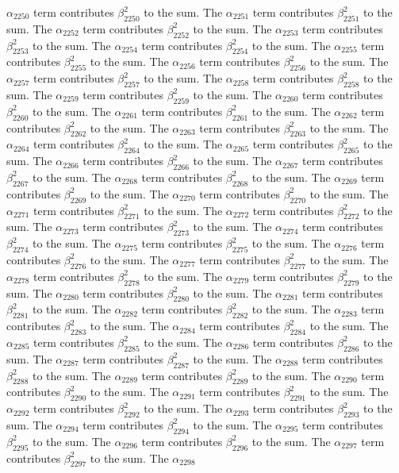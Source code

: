 \begin{lemma}
$\alpha_{2250}$ term contributes $\beta_{2250}^{2}$ to the sum. The $\alpha_{2251}$ term contributes $\beta_{2251}^{2}$ to the sum. The $\alpha_{2252}$ term contributes $\beta_{2252}^{2}$ to the sum. The $\alpha_{2253}$ term contributes $\beta_{2253}^{2}$ to the sum. The $\alpha_{2254}$ term contributes $\beta_{2254}^{2}$ to the sum. The $\alpha_{2255}$ term contributes $\beta_{2255}^{2}$ to the sum. The $\alpha_{2256}$ term contributes $\beta_{2256}^{2}$ to the sum. The $\alpha_{2257}$ term contributes $\beta_{2257}^{2}$ to the sum. The $\alpha_{2258}$ term contributes $\beta_{2258}^{2}$ to the sum. The $\alpha_{2259}$ term contributes $\beta_{2259}^{2}$ to the sum. The $\alpha_{2260}$ term contributes $\beta_{2260}^{2}$ to the sum. The $\alpha_{2261}$ term contributes $\beta_{2261}^{2}$ to the sum. The $\alpha_{2262}$ term contributes $\beta_{2262}^{2}$ to the sum. The $\alpha_{2263}$ term contributes $\beta_{2263}^{2}$ to the sum. The $\alpha_{2264}$ term contributes $\beta_{2264}^{2}$ to the sum. The $\alpha_{2265}$ term contributes $\beta_{2265}^{2}$ to the sum. The $\alpha_{2266}$ term contributes $\beta_{2266}^{2}$ to the sum. The $\alpha_{2267}$ term contributes $\beta_{2267}^{2}$ to the sum. The $\alpha_{2268}$ term contributes $\beta_{2268}^{2}$ to the sum. The $\alpha_{2269}$ term contributes $\beta_{2269}^{2}$ to the sum. The $\alpha_{2270}$ term contributes $\beta_{2270}^{2}$ to the sum. The $\alpha_{2271}$ term contributes $\beta_{2271}^{2}$ to the sum. The $\alpha_{2272}$ term contributes $\beta_{2272}^{2}$ to the sum. The $\alpha_{2273}$ term contributes $\beta_{2273}^{2}$ to the sum. The $\alpha_{2274}$ term contributes $\beta_{2274}^{2}$ to the sum. The $\alpha_{2275}$ term contributes $\beta_{2275}^{2}$ to the sum. The $\alpha_{2276}$ term contributes $\beta_{2276}^{2}$ to the sum. The $\alpha_{2277}$ term contributes $\beta_{2277}^{2}$ to the sum. The $\alpha_{2278}$ term contributes $\beta_{2278}^{2}$ to the sum. The $\alpha_{2279}$ term contributes $\beta_{2279}^{2}$ to the sum. The $\alpha_{2280}$ term contributes $\beta_{2280}^{2}$ to the sum. The $\alpha_{2281}$ term contributes $\beta_{2281}^{2}$ to the sum. The $\alpha_{2282}$ term contributes $\beta_{2282}^{2}$ to the sum. The $\alpha_{2283}$ term contributes $\beta_{2283}^{2}$ to the sum. The $\alpha_{2284}$ term contributes $\beta_{2284}^{2}$ to the sum. The $\alpha_{2285}$ term contributes $\beta_{2285}^{2}$ to the sum. The $\alpha_{2286}$ term contributes $\beta_{2286}^{2}$ to the sum. The $\alpha_{2287}$ term contributes $\beta_{2287}^{2}$ to the sum. The $\alpha_{2288}$ term contributes $\beta_{2288}^{2}$ to the sum. The $\alpha_{2289}$ term contributes $\beta_{2289}^{2}$ to the sum. The $\alpha_{2290}$ term contributes $\beta_{2290}^{2}$ to the sum. The $\alpha_{2291}$ term contributes $\beta_{2291}^{2}$ to the sum. The $\alpha_{2292}$ term contributes $\beta_{2292}^{2}$ to the sum. The $\alpha_{2293}$ term contributes $\beta_{2293}^{2}$ to the sum. The $\alpha_{2294}$ term contributes $\beta_{2294}^{2}$ to the sum. The $\alpha_{2295}$ term contributes $\beta_{2295}^{2}$ to the sum. The $\alpha_{2296}$ term contributes $\beta_{2296}^{2}$ to the sum. The $\alpha_{2297}$ term contributes $\beta_{2297}^{2}$ to the sum. The $\alpha_{2298}$ 
\end{lemma}
